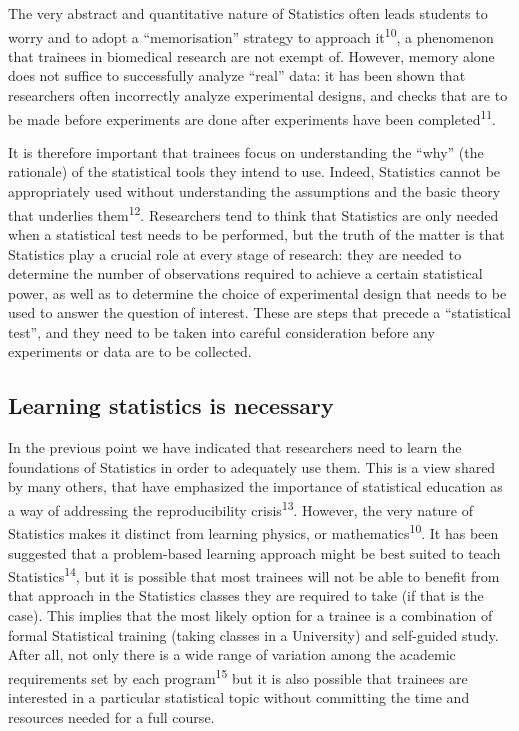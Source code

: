 \documentclass[smallextended]{svjour3}       %
\begin{document}
The very abstract and quantitative nature of Statistics often leads
students to worry and to adopt a ``memorisation'' strategy to approach
it\textsuperscript{10}, a phenomenon that trainees in biomedical
research are not exempt of. However, memory alone does not suffice to
successfully analyze ``real'' data: it has been shown that researchers
often incorrectly analyze experimental designs, and checks that are to
be made before experiments are done after experiments have been
completed\textsuperscript{11}.

It is therefore important that trainees focus on understanding the
``why'' (the rationale) of the statistical tools they intend to use.
Indeed, Statistics cannot be appropriately used without understanding
the assumptions and the basic theory that underlies
them\textsuperscript{12}. Researchers tend to think that Statistics are
only needed when a statistical test needs to be performed, but the truth
of the matter is that Statistics play a crucial role at every stage of
research: they are needed to determine the number of observations
required to achieve a certain statistical power, as well as to determine
the choice of experimental design that needs to be used to answer the
question of interest. These are steps that precede a ``statistical
test'', and they need to be taken into careful consideration before any
experiments or data are to be collected.

\hypertarget{learning-statistics-is-necessary}{%
\subsection{Learning statistics is
necessary}\label{learning-statistics-is-necessary}}

In the previous point we have indicated that researchers need to learn
the foundations of Statistics in order to adequately use them. This is a
view shared by many others, that have emphasized the importance of
statistical education as a way of addressing the reproducibility
crisis\textsuperscript{13}. However, the very nature of Statistics makes
it distinct from learning physics, or mathematics\textsuperscript{10}.
It has been suggested that a problem-based learning approach might be
best suited to teach Statistics\textsuperscript{14}, but it is possible
that most trainees will not be able to benefit from that approach in the
Statistics classes they are required to take (if that is the case). This
implies that the most likely option for a trainee is a combination of
formal Statistical training (taking classes in a University) and
self-guided study. After all, not only there is a wide range of
variation among the academic requirements set by each
program\textsuperscript{15} but it is also possible that trainees are
interested in a particular statistical topic without committing the time
and resources needed for a full course.
\end{document}
